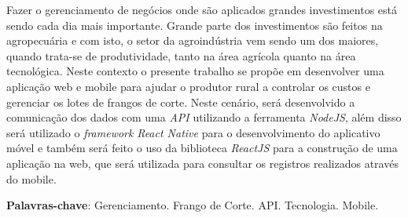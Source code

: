 
\begin{resumo}[RESUMO]
\begin{SingleSpacing}


Fazer o gerenciamento de negócios onde são aplicados grandes investimentos está sendo cada dia mais importante. Grande parte dos investimentos são feitos na agropecuária e com isto, o setor da agroindústria vem sendo um dos maiores, quando trata-se de produtividade, tanto na área agrícola quanto na área tecnológica. Neste contexto o presente trabalho se propõe em  desenvolver uma aplicação web e mobile para ajudar o produtor rural a controlar os custos e gerenciar os lotes de frangos de corte. Neste cenário, será desenvolvido a comunicação dos dados com uma \textit{API} utilizando a ferramenta \textit{NodeJS}, além disso será utilizado o \textit{framework} \textit{React Native} para o desenvolvimento do aplicativo móvel e também será feito o uso da biblioteca \textit{ReactJS} para a construção de uma aplicação na web, que será utilizada para consultar os registros realizados através do mobile. 


\textbf{Palavras-chave}: Gerenciamento. Frango de Corte. API. Tecnologia. Mobile.

\end{SingleSpacing}
\end{resumo}

